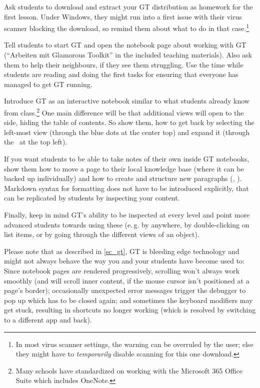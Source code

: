 \begin{instructions}
\item Ask students to download and extract your \ac{GT} distribution as homework for the first lesson. Under Windows, they might run into a first issue with their virus scanner blocking the download, so remind them about what to do in that case.\footnote{In most virus scanner settings, the warning can be overruled by the user; else they might have to \emph{temporarily} disable scanning for this one download.}
\item Tell students to start \ac{GT} and open the notebook page about working with \ac{GT} (``Arbeiten mit Glamorous Toolkit'' in the included teaching materials). Also ask them to help their neighbours, if they see them struggling. Use the time while students are reading and doing the first tasks for ensuring that everyone has managed to get \ac{GT} running.
\item Introduce \ac{GT} as an interactive notebook similar to what students already know from class.\footnote{Many schools have standardized on working with the Microsoft 365 Office Suite which includes OneNote.} One main difference will be that additional views will open to the side, hiding the table of contents. So show them, how to get back by selecting the left-most view (through the blue dots at the center top) and expand it (through the \faPlusCircle\ at the top left).
\item If you want students to be able to take notes of their own inside \ac{GT} notebooks, show them how to move a page to their local knowledge base (where it can be backed up individually) and how to create and structure new paragraphs (, ). Markdown syntax for formatting does not have to be introduced explicitly, that can be replicated by students by inspecting your content.
\item Finally, keep in mind \ac{GT}'s ability to be inspected at every level and point more advanced students towards using these (e.\,g. by  anywhere, by double-clicking on list items, or by going through the different views of an object).
\end{instructions}

Please note that as described in \ref{sc_gt}, \ac{GT} is bleeding edge technology and might not always behave the way you and your students have become used to: Since notebook pages are rendered progressively, scrolling won't always work smoothly (and will scroll inner content, if the mouse cursor isn't positioned at a page's border); occasionally unexpected error messages trigger the debugger to pop up which has to be closed again; and sometimes the keyboard modifiers may get stuck, resulting in shortcuts no longer working (which is resolved by switching to a different app and back).


